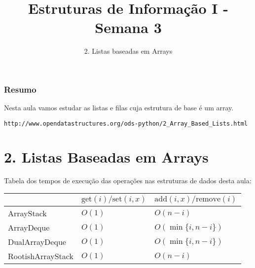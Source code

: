 \documentclass{beamer}
\title[\sc{Estruturas de Informação I}]{Estruturas de Informação I - Semana 3}
\subtitle{2. Listas baseadas em Arrays}
\begin{document}
\begin{frame}
  \titlepage
\end{frame}

\begin{frame}
	\frametitle{Resumo}
	Nesta aula vamos estudar as listas e filas cuja estrutura de base é um array.
	
	{\footnotesize \texttt{http://www.opendatastructures.org/ods-python/2\_Array\_Based\_Lists.html}}
	\tableofcontents
\end{frame}


\section{2. Listas Baseadas em Arrays}
\begin{frame}
Tabela dos tempos de execução das operações nas estruturas de dados desta aula:
\newlength{\tabsep}
\setlength{\tabsep}{\itemsep}
\addtolength{\tabsep}{\parsep}
\addtolength{\tabsep}{-2pt}
\begin{center}
\vspace{\tabsep}
\begin{tabular}{|l|l|l|} \hline
 & $\ensuremath{\ensuremath{\mathrm{get}(\ensuremath{\mathit{i}})}}/\ensuremath{\ensuremath{\mathrm{set}(\ensuremath{\mathit{i}},\ensuremath{\mathit{x}})}}$ & $ \ensuremath{\ensuremath{\mathrm{add}(\ensuremath{\mathit{i}},\ensuremath{\mathit{x}})}}/\ensuremath{\ensuremath{\mathrm{remove}(\ensuremath{\mathit{i}})}}$ \\ \hline
ArrayStack & $O(1)$ & $O(\ensuremath{\ensuremath{\ensuremath{\mathit{n}}}}-\ensuremath{\ensuremath{\ensuremath{\mathit{i}}}})$ \\
ArrayDeque & $O(1)$ & $O(\min\{\ensuremath{\ensuremath{\ensuremath{\mathit{i}}}},\ensuremath{\ensuremath{\ensuremath{\mathit{n}}}}-\ensuremath{\ensuremath{\ensuremath{\mathit{i}}}}\})$ \\
DualArrayDeque & $O(1)$ & $O(\min\{\ensuremath{\ensuremath{\ensuremath{\mathit{i}}}},\ensuremath{\ensuremath{\ensuremath{\mathit{n}}}}-\ensuremath{\ensuremath{\ensuremath{\mathit{i}}}}\})$ \\
RootishArrayStack & $O(1)$ & $O(\ensuremath{\ensuremath{\ensuremath{\mathit{n}}}}-\ensuremath{\ensuremath{\ensuremath{\mathit{i}}}})$ \\ \hline
\end{tabular}
\vspace{\tabsep}
\end{center}
\end{frame}
\end{document}
